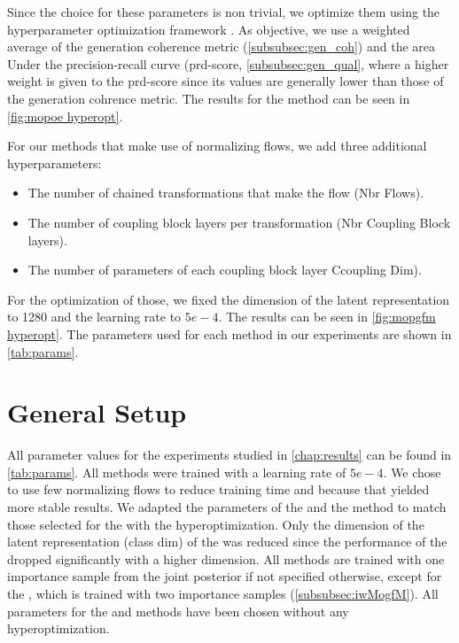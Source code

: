 Since the choice for these parameters is non trivial, we optimize them using the hyperparameter optimization framework  \citep{akiba_optuna_2019}.
As objective, we use a weighted average of the generation coherence metric (\cref{subsubsec:gen_coh}) and the area Under the precision-recall curve (prd-score, \cref{subsubsec:gen_qual}, where a higher weight is given to the prd-score since its values are generally lower than those of the generation cohrence metric.
The results for the  method can be seen in \cref{fig:mopoe hyperopt}.

For our methods that make use of normalizing flows, we add three additional hyperparameters:
\begin{itemize}
    \item The number of chained transformations that make the flow (Nbr Flows).
    \item The number of coupling block layers per transformation (Nbr Coupling Block layers).
    \item The number of parameters of each coupling block layer Ccoupling Dim).
\end{itemize}

For the optimization of those, we fixed the dimension of the latent representation to 1280 and the learning rate to $5e-4$.
The results can be seen in \cref{fig:mopgfm hyperopt}.
The parameters used for each method in our experiments are shown in \cref{tab:params}.


\section{General Setup}
All parameter values for the experiments studied in \cref{chap:results} can be found in \cref{tab:params}.
All methods were trained with a learning rate of $5e-4$.
We chose to use few normalizing flows to reduce training time and because that yielded more stable results.
We adapted the parameters of the  and the  method to match those selected for the  with the hyperoptimization.
Only the dimension of the latent representation (class dim) of the  was reduced since the performance of the  dropped significantly with a higher dimension.
All methods are trained with one importance sample from the joint posterior if not specified otherwise, except for the , which is trained with two importance samples (\cref{subsubsec:iwMogfM}).
All parameters for the  and  methods have been chosen without any hyperoptimization.


